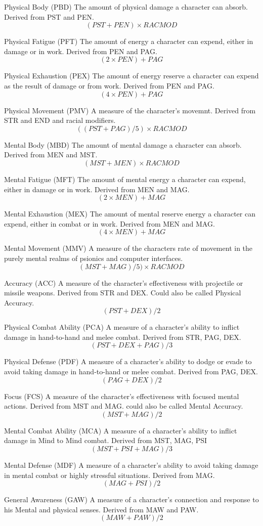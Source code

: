 \begin{relate}
	\item[Physical Body (PBD)]
	The amount of physical damage a character can absorb. Derived from PST
	and PEN.
	\[(PST+PEN) \times RAC MOD \]
	\item[Physical Fatigue (PFT)]
	The amount of energy a character can expend, either in damage or in
	work. Derived from PEN and PAG.
	\[(2 \times PEN)+PAG\]
	\item[Physical Exhaustion (PEX)]
	The amount of energy reserve a character can expend as the result of
	damage or from work. Derived from PEN and PAG.
	\[(4 \times PEN)+PAG\]
	\item[Physical Movement (PMV)]
	A measure of the character's movemnt. Derived from STR and END and
	racial modifiers.
	\[((PST+PAG)/5) \times RAC MOD\]
	\item[Mental Body (MBD)]
	The amount of mental damage a character can absorb. Derived from MEN and MST.
	\[(MST+MEN) \times RAC MOD\]
	\item[Mental Fatigue (MFT)]
	The amount of mental energy a character can expend, either in damage
	or in work. Derived from MEN and MAG.
	\[(2 \times MEN)+MAG\]
	\item[Mental Exhaustion (MEX)]
	The amount of mental reserve energy a character can expend, either in combat
	or in work. Derived from MEN and MAG.
	\[(4 \times MEN)+MAG\]
	\item[Mental Movement (MMV)]
	A measure of the characters rate of movement in the purely mental
	realms of psionics and computer interfaces.
	\[(MST+MAG)/5)\times RAC MOD \]

	\item[Accuracy (ACC)]
	A measure of the character's effectiveness with projectile or missile
	weapons. Derived from STR and DEX. Could also be called Physical
	Accuracy.
	\[(PST+DEX)/2		  \]
	\item[Physical Combat Ability (PCA)]
	A measure of a character's ability to in\-flict
	dam\-age in hand-to-hand and melee combat. Derived from
	STR, PAG, DEX.
	\[(PST+DEX+PAG)/3 \]
	\item[Physical Defense (PDF)]
	A measure of a character's ability to dodge or evade  to avoid
	taking damage in hand-to-hand or melee combat. Derived
	from PAG, DEX.
	\[(PAG+DEX)/2 \]
	\item[Focus	(FCS)]
	A measure of the character's effectiveness with focused mental
	actions. Derived from MST and MAG. could also be called Mental
	Accuracy.
	\[(MST+MAG)/2 \]
	\item[Mental Combat Ability (MCA)]
	A measure of a character's ability to inflict damage in Mind to Mind
	combat. Derived from MST, MAG, PSI
	\[(MST+PSI+MAG)/3 \]
	\item[Mental Defense (MDF)]
	A measure of a character's ability to avoid taking damage in mental
	combat or highly stressful situations. Derived from MAG.
	\[(MAG+PSI)/2 \]
	\item[General Awareness (GAW)]
	A measure of a character's connection and response to his Mental and
	physical senses. Derived from MAW and PAW.
	\[(MAW+PAW)/2 \]
\end{relate}

